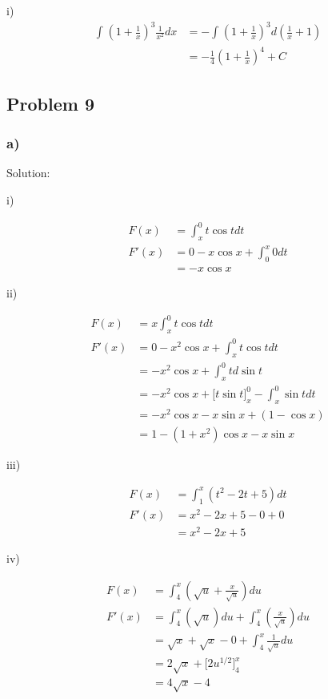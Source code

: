 \documentclass[letterpaper, 11pt]{article}
\newcommand{\1}{\mathds{1}}	%
\theoremstyle{definition}
\begin{document}
i)
\begin{align*}
  \int_{}^{}(1+\frac{1}{x})^{3}\frac{1}{x ^{2}} dx &= -\int_{}^{}(1 + \frac{1}{x})^{3}d(\frac{1}{x} + 1) \\
  &= -\frac{1}{4} (1+\frac{1}{x})^{4} + C
\end{align*}

\subsection*{Problem 9}

\subsubsection*{a)}

Solution:

i)

\begin{align*}
  F(x) &= \int_{x}^{0} t \cos t dt  \\
  F'(x) &= 0 - x \cos x + \int_{0}^{x} 0 dt \\
  &= -x\cos x
\end{align*}

ii)

\begin{align*}
  F(x) &= x\int_{x}^{0} t \cos t dt  \\
  F'(x) &= 0 - x ^{2}\cos x + \int_{x}^{0}t \cos t dt \\
      &= -x ^{2} \cos x + \int_{x}^{0}t d \sin t \\
      &= -x ^{2} \cos x + \Big[ t \sin t \Big]_{x}^{0} - \int_{x}^{0}\sin t dt \\
      &= -x ^{2} \cos x - x \sin x + (1 - \cos x) \\
      &= 1 - (1+x ^{2})\cos x - x \sin x
\end{align*}

iii)

\begin{align*}
  F(x) &= \int_{1}^{x}(t ^{2} - 2t + 5) dt \\
F'(x) &= x ^{2} - 2x + 5 - 0+ 0 \\
&= x ^{2} - 2x + 5
\end{align*}

iv)

\begin{align*}
  F(x) &= \int_{4}^{x}(\sqrt{u} + \frac{x}{\sqrt{u}}) du \\
  F'(x) &=\int_{4}^{x}(\sqrt{u}) du +\int_{4}^{x}( \frac{x}{\sqrt{u}}) du \\
  &= \sqrt{x} + \sqrt{x} - 0 + \int_{4}^{x}\frac{1}{\sqrt{u}} du \\
  &= 2 \sqrt{x} + \Big[ 2 u ^{1/2} \Big]_{4}^{x} \\
  &= 4 \sqrt{x} - 4
\end{align*}
\end{document}
